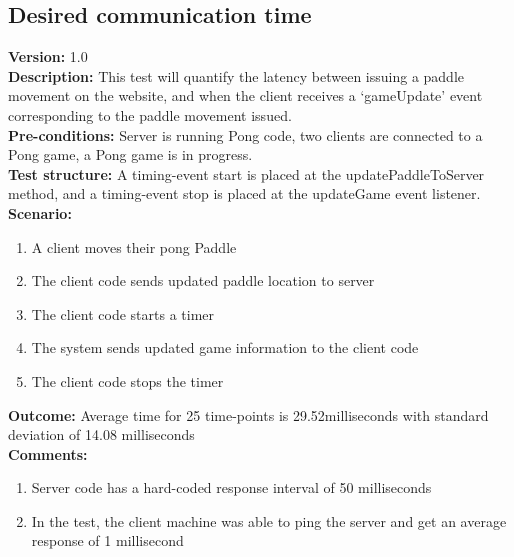 \documentclass[12pt]{article}
\begin{document}
    \subsection{Desired communication time}
    \textbf{Version:} 1.0\\
    \textbf{Description:} This test will quantify the latency between issuing a paddle movement on the website, and when the client receives a ‘gameUpdate’ event corresponding to the paddle movement issued.\\
    \textbf{Pre-conditions:} Server is running Pong code, two clients are connected to a Pong game, a Pong game is in progress.\\
    \textbf{Test structure:} A timing-event start is placed at the updatePaddleToServer method, and a timing-event stop is placed at the updateGame event listener.\\
    \textbf{Scenario:}
    \begin{enumerate}
        \item A client moves their pong Paddle
        \item The client code sends updated paddle location to server
        \item The client code starts a timer
        \item The system sends updated game information to the client code
        \item The client code stops the timer
    \end{enumerate}
    \textbf{Outcome:} Average time for 25 time-points is 29.52milliseconds with standard deviation of 14.08 milliseconds\\
    \textbf{Comments:}
    \begin{enumerate}
        \item Server code has a hard-coded response interval of 50 milliseconds
        \item In the test, the client machine was able to ping the server and get an average response of 1 millisecond
    \end{enumerate}
\end{document}
